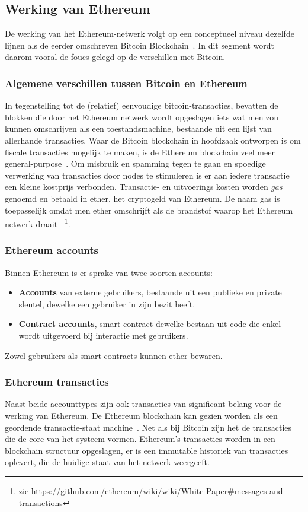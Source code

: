 	\subsection{Werking van Ethereum}
		De werking van het Ethereum-netwerk volgt op een conceptueel niveau dezelfde lijnen als de eerder omschreven Bitcoin Blockchain~\autocite{Wood2017}. In dit segment wordt daarom vooral de foucs gelegd op de verschillen met Bitcoin. 
		\subsubsection{Algemene verschillen tussen Bitcoin en Ethereum}
			In tegenstelling tot de (relatief) eenvoudige bitcoin-transacties, bevatten de blokken die door het Ethereum netwerk wordt opgeslagen iets wat men zou kunnen omschrijven als een toestandsmachine, bestaande uit een lijst van allerhande transacties. Waar de Bitcoin blockchain in hoofdzaak ontworpen is om fiscale transacties mogelijk te maken, is de Ethereum blockchain veel meer general-purpose~\autocite{McCorry2017}. Om misbruik en spamming tegen te gaan en spoedige verwerking van transacties door nodes te stimuleren is er aan iedere transactie een kleine kostprijs verbonden. Transactie- en uitvoerings kosten worden \textit{gas} genoemd en betaald in ether, het cryptogeld van Ethereum. De naam gas is toepasselijk omdat men ether omschrijft als de brandstof waarop het Ethereum netwerk draait ~\autocite{Buterin2014}\footnote{zie https://github.com/ethereum/wiki/wiki/White-Paper\#messages-and-transactions}.
		\subsubsection{Ethereum accounts}
		Binnen Ethereum is er sprake van twee soorten accounts: 
		\begin{itemize}
			\item \textbf{Accounts} van externe gebruikers, bestaande uit een publieke en private sleutel, dewelke een gebruiker in zijn bezit heeft.
			\item \textbf{Contract accounts}, smart-contract dewelke bestaan uit code die enkel wordt uitgevoerd bij interactie met gebruikers.
		\end{itemize}	
		Zowel gebruikers als smart-contracts kunnen ether bewaren. ~\autocite{McCorry2017}
		\subsubsection{Ethereum transacties}
			Naast beide accounttypes zijn ook transacties van significant belang voor de werking van Ethereum. De Ethereum blockchain kan gezien worden als een geordende transactie-staat machine~\autocite{McCorry2017}. Net als bij Bitcoin zijn het  de transacties die  de core van het systeem vormen. Ethereum's transacties worden in een blockchain structuur opgeslagen, er is een immutable historiek van transacties oplevert, die de huidige staat van het netwerk weergeeft. ~\autocite{Buterin2014}

